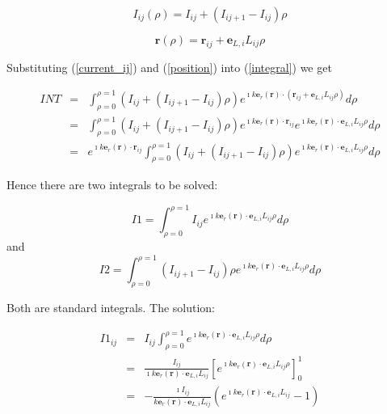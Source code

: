 \documentclass[a4paper,10pt]{report}
\begin{document}
\begin{equation}\label{current_ij}
    I_{ij}(\rho)=I_{ij}+(I_{ij+1}-I_{ij})\rho
\end{equation}



\begin{equation}\label{position}
    \mathbf{r}(\rho)=\mathbf{r}_{ij}+\mathbf{e}_{L,i}L_{ij}\rho
\end{equation}

Substituting (\ref{current_ij}) and (\ref{position}) into (\ref{integral}) we get

\begin{eqnarray}
    INT&=& \int_{\rho=0}^{\rho=1} \left(I_{ij}+(I_{ij+1}-I_{ij})\rho\right) e^{\imath k \mathbf{e}_r(\mathbf{r}) \cdot (\mathbf{r}_{ij}+\mathbf{e}_{L,i}L_{ij}\rho)} d\rho \\
&=&\int_{\rho=0}^{\rho=1} \left(I_{ij}+(I_{ij+1}-I_{ij})\rho\right) e^{\imath k \mathbf{e}_r(\mathbf{r}) \cdot \mathbf{r}_{ij}}e^{\imath k \mathbf{e}_r(\mathbf{r}) \cdot\mathbf{e}_{L,i}L_{ij}\rho} d\rho \nonumber \\
&=&e^{\imath k \mathbf{e}_r(\mathbf{r}) \cdot \mathbf{r}_{ij}}\int_{\rho=0}^{\rho=1} \left(I_{ij}+(I_{ij+1}-I_{ij})\rho\right) e^{\imath k \mathbf{e}_r(\mathbf{r}) \cdot\mathbf{e}_{L,i}L_{ij}\rho} d\rho \nonumber
\end{eqnarray}

Hence there are two integrals to be solved:

\begin{equation}\label{I1}
    I1=\int_{\rho=0}^{\rho=1}I_{ij} e^{\imath k \mathbf{e}_r(\mathbf{r}) \cdot\mathbf{e}_{L,i}L_{ij}\rho} d\rho
\end{equation}
and
\begin{equation}\label{I2}
    I2=\int_{\rho=0}^{\rho=1}\left(I_{ij+1}-I_{ij}\right)\rho e^{\imath k \mathbf{e}_r(\mathbf{r}) \cdot\mathbf{e}_{L,i}L_{ij}\rho} d\rho
\end{equation}

Both are standard integrals. The solution:

\begin{eqnarray}\label{I1_solution}
    I1_{ij}&=&I_{ij}\int_{\rho=0}^{\rho=1}e^{\imath k \mathbf{e}_r(\mathbf{r}) \cdot\mathbf{e}_{L,i}L_{ij}\rho} d\rho \\
&=&\frac{I_{ij}}{\imath k \mathbf{e}_r(\mathbf{r}) \cdot\mathbf{e}_{L,i}L_{ij}} \left[ e^{\imath k \mathbf{e}_r(\mathbf{r}) \cdot \mathbf{e}_{L,i}L_{ij}\rho} \right]_0^1 \nonumber \\
&=&-\frac{\imath I_{ij}}{ k \mathbf{e}_r(\mathbf{r}) \cdot\mathbf{e}_{L,i}L_{ij}}  \left( e^{\imath k \mathbf{e}_r(\mathbf{r}) \cdot \mathbf{e}_{L,i}L_{ij}}-1 \right)  \nonumber
\end{eqnarray}
\end{document}
